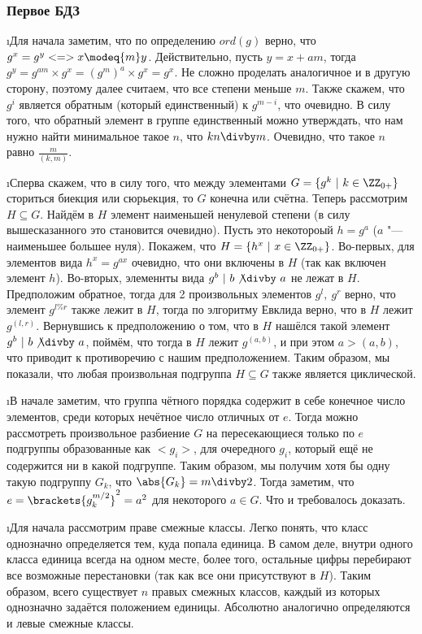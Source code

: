 \subsubsection{Первое БДЗ}

\i Для начала заметим, что по определению $ord(g)$ верно, что $g^{x} = g^{y} <=> x \modeq{m} y$. Действительно, пусть $y = x + am$, тогда $g^{y} = g^{am} \times g^{x} = (g^m)^a \times g^x = g^x$. Не сложно проделать аналогичное и в другую сторону, поэтому далее считаем, что все степени меньше $m$. Также скажем, что $g^{i}$ является обратным (который единственный) к $g^{m-i}$, что очевидно. В силу того, что обратный элемент в группе единственный можно утверждать, что нам нужно найти минимальное такое $n$, что $kn \divby m$. Очевидно, что такое $n$ равно $\frac{m}{(k, m)}$.

\i Сперва скажем, что в силу того, что между элементами $G = \{g^k \ |\ k \in \ZZ_{0+}\}$ сториться биекция или сюрьекция, то $G$ конечна или счётна. Теперь рассмотрим $H \subseteq G$. Найдём в $H$ элемент наименьшей ненулевой степени (в силу вышесказанного это становится очевидно). Пусть это некотороый $h = g^{a}$ ($a$ "--- наименьшее большее нуля). Покажем, что $H = \{h^{x} \ |\ x \in \ZZ_{0+}\}$. Во-первых, для элементов вида $h^x = g^{ax}$ очевидно, что они включены в $H$ (так как включен элемент $h$). Во-вторых, элеменнты вида $g^b \ |\ b \not\divby\ a$ не лежат в $H$. Предположим обратное, тогда для 2 произвольных элементов $g^{l},\ g^{r}$ верно, что элемент $g^{l\%r}$ также лежит в $H$, тогда по элгоритму Евклида верно, что в $H$ лежит $g^{(l, r)}$. Вернувшись к предположению о том, что в $H$ нашёлся такой элемент $g^b \ |\ b \not\divby\ a$, поймём, что тогда в $H$ лежит $g^{(a, b)}$, и при этом $a > (a, b)$, что приводит к противоречию с нашим предположением. Таким образом, мы показали, что любая произвольная подгруппа $H \subseteq G$ также является циклической.

\i В начале заметим, что группа чётного порядка содержит в себе конечное число элементов, среди которых нечётное число отличных от $e$. Тогда можно рассмотреть произвольное разбиение $G$ на пересекающиеся только по $e$ подгруппы образованные как $<$$g_i$$>$, для очередного $g_i$, который ещё не содержится ни в какой подгруппе. Таким образом, мы получим хотя бы одну такую подгруппу $G_k$, что $\abs{G_k} = m \divby 2$. Тогда заметим, что $e = \brackets{g_k^{m/2}}^2 = a^2$ для некоторого $a \in G$. Что и требовалось доказать.

\i Для начала рассмотрим праве смежные классы. Легко понять, что класс однозначно определяется тем, куда попала единица. В самом деле, внутри одного класса единица всегда на одном месте, более того, остальные цифры перебирают все возможные перестановки (так как все они присутствуют в $H$). Таким образом, всего существует $n$ правых смежных классов, каждый из которых однозначно задаётся положением единицы. Абсолютно аналогично определяются и левые смежные классы.